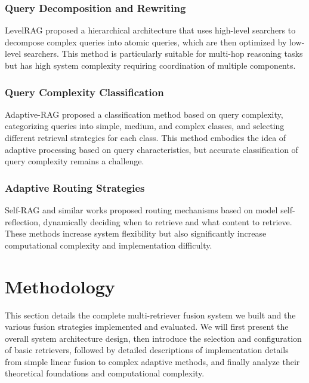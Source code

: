 \documentclass[letterpaper]{article} %
\begin{document}
\subsubsection{Query Decomposition and Rewriting}

LevelRAG \cite{jiang2023levelrag} proposed a hierarchical architecture that uses high-level searchers to decompose complex queries into atomic queries, which are then optimized by low-level searchers. This method is particularly suitable for multi-hop reasoning tasks but has high system complexity requiring coordination of multiple components.

\subsubsection{Query Complexity Classification}

Adaptive-RAG \cite{jeong2024adaptive} proposed a classification method based on query complexity, categorizing queries into simple, medium, and complex classes, and selecting different retrieval strategies for each class. This method embodies the idea of adaptive processing based on query characteristics, but accurate classification of query complexity remains a challenge.

\subsubsection{Adaptive Routing Strategies}

Self-RAG \cite{jeong2024adaptive} and similar works proposed routing mechanisms based on model self-reflection, dynamically deciding when to retrieve and what content to retrieve. These methods increase system flexibility but also significantly increase computational complexity and implementation difficulty.

\section{Methodology}

This section details the complete multi-retriever fusion system we built and the various fusion strategies implemented and evaluated. We will first present the overall system architecture design, then introduce the selection and configuration of basic retrievers, followed by detailed descriptions of implementation details from simple linear fusion to complex adaptive methods, and finally analyze their theoretical foundations and computational complexity.
\end{document}
